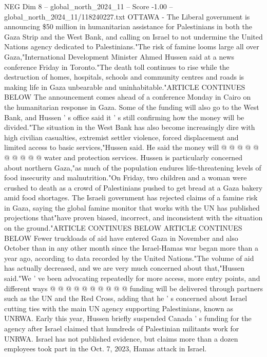 \begin{textsample}{NEG Dim 8 – global\_north\_2024\_11 – Score -1.00 – global\_north\_2024\_11/118240227.txt}  \label{ex:f8_neg_310}
OTTAWA - The Liberal government is announcing \$50 million in humanitarian assistance for Palestinians in both the Gaza Strip and the West Bank, and calling on Israel to not undermine the United Nations agency dedicated to Palestinians."The risk of famine looms large all over Gaza,"International Development Minister Ahmed Hussen said at a news conference Friday in Toronto."The death toll continues to rise while the destruction of homes, hospitals, schools and community centres and roads is making life in Gaza unbearable and uninhabitable."ARTICLE CONTINUES BELOW The announcement comes ahead of a conference Monday in Cairo on the humanitarian response in Gaza.
Some of the funding will also go to the West Bank, and Hussen ' s office said it ' s still confirming how the money will be divided."The situation in the West Bank has also become increasingly dire with high civilian casualties, extremist settler violence, forced displacement and limited access to basic services,"Hussen said.
He said the money will @ @ @ @ @ @ @ @ @ @ water and protection services.
Hussen is particularly concerned about northern Gaza,"as much of the population endures life-threatening levels of food insecurity and malnutrition."On Friday, two children and a woman were crushed to death as a crowd of Palestinians pushed to get bread at a Gaza bakery amid food shortages.
The Israeli government has rejected claims of a famine risk in Gaza, saying the global famine monitor that works with the UN has published projections that"have proven biased, incorrect, and inconsistent with the situation on the ground."ARTICLE CONTINUES BELOW ARTICLE CONTINUES BELOW Fewer truckloads of aid have entered Gaza in November and also October than in any other month since the Israel-Hamas war began more than a year ago, according to data recorded by the United Nations."The volume of aid has actually decreased, and we are very much concerned about that,"Hussen said."We ' ve been advocating repeatedly for more access, more entry points, and different ways @ @ @ @ @ @ @ @ @ @ funding will be delivered through partners such as the UN and the Red Cross, adding that he ' s concerned about Israel cutting ties with the main UN agency supporting Palestinians, known as UNRWA.
Early this year, Hussen briefly suspended Canada ' s funding for the agency after Israel claimed that hundreds of Palestinian militants work for UNRWA.
Israel has not published evidence, but claims more than a dozen employees took part in the Oct. 7, 2023, Hamas attack in Israel.

\end{textsample}
